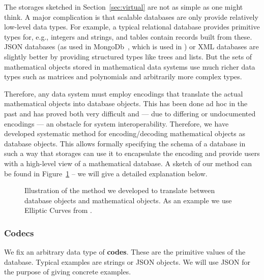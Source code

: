 The storages sketched in Section~\ref{sec:virtual} are not as simple as one might think.
A major complication is that scalable databases are only provide relatively low-level data types.
For example, a typical relational database provides primitive types for, e.g., integers and strings, and tables contain records built from these.
JSON databases (as used in MongoDb~\cite{Chodorow:mdg10}, which is used in \LMFDB) or XML databases are slightly better by providing structured types like trees and lists.
But the sets of mathematical objects stored in mathematical data systems use much richer data types such as matrices and polynomials and arbitrarily more complex types.

Therefore, any data system must employ encodings that translate the actual mathematical objects into database objects.
This has been done ad hoc in the past and has proved both very difficult and --- due to differing or undocumented encodings --- an obstacle for system interoperability.
Therefore, we have developed systematic method for encoding/decoding mathematical objects as database objects.
This allows formally specifying the schema of a database in such a way that \MMT storages can use it to encapsulate the encoding and provide users with a high-level view of a mathematical database.
A sketch of our method can be found in Figure~\ref{fig:codec_arch} -- we will give a
detailed explanation below.

\begin{figure}[ht]\centering
  \providecommand\myxscale{3.2}
  \providecommand\myyscale{1.5}
  \providecommand\myfontsize{\footnotesize}
  
  \caption[Translation between Database and Mathematical Objects]{ Illustration of the
    method we developed to translate between database objects and mathematical objects.
    As an example we use Elliptic Curves from \LMFDB.  }
  \label{fig:codec_arch}
\end{figure}


\subsubsection{Codecs}

We fix an arbitrary data type of \textbf{codes}.  These are the primitive values of the
database.  Typical examples are strings or JSON objects.  We will use JSON for the purpose
of giving concrete examples.

